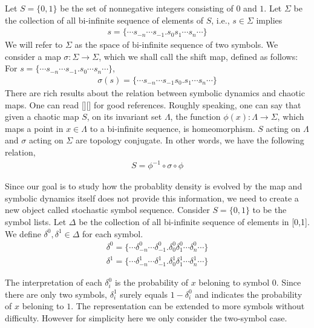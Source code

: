 \documentclass{article}
\begin{document}
Let $S=\{0, 1\}$ be the set of nonnegative integers consisting of $0$ and $1$. Let $\Sigma$ be the collection of all bi-infinite sequence of elements of $S$, i.e., $s\in \Sigma$ implies
 \begin{eqnarray}
 s= \{\cdots s_{-n}\cdots s_{-1}.s_0s_1\cdots s_n\cdots\}
 \end{eqnarray}
We will refer to $\Sigma$ as the space of bi-infinite sequence of two symbols. We consider a map $\sigma:\Sigma \rightarrow \Sigma$, which we shall call the shift map, defined as follows: For $s= \{\cdots s_{-n}\cdots s_{-1}.s_0\cdots s_n\cdots\}$, 
  \begin{eqnarray}
 \sigma(s)= \{\cdots s_{-n}\cdots s_{-1}s_0.s_1\cdots s_n\cdots\}
 \end{eqnarray}
There are rich results about the relation between symbolic dynamics and chaotic maps. One can read [][] for good references. Roughly speaking, one can say that given a chaotic map $S$, on its invariant set $\Lambda$, the function $\phi(x): \Lambda \rightarrow \Sigma$, which maps a point in $x\in \Lambda$ to a bi-infinite sequence, is homeomorphism. $S$ acting on $\Lambda$ and $\sigma$ acting on $\Sigma$ are topology conjugate. In other words, we have the following relation,
 \begin{eqnarray}
 S = \phi^{-1}\circ \sigma \circ \phi
 \end{eqnarray}


Since our goal is to study how the probablity density is evolved by the map and symbolic dynamics itself does not provide this information, we need to create a new object called stochastic symbol sequence. Consider $S=\{0, 1\}$ to be the symbol lists. Let $\Delta$ be the collection of all bi-infinite sequence of elements in [0,1]. We define $\delta^0 , \delta^1 \in \Delta$ for each symbol.
 \begin{eqnarray}
 \delta^0 = \{\cdots \delta_{-n}^0\cdots \delta_{-1}^0.\delta_0^0 \delta_1^0\cdots \delta_n^0\cdots\}\\
 \delta^1 = \{\cdots \delta_{-n}^1\cdots \delta_{-1}^1.\delta_0^1 \delta_1^1\cdots \delta_n^1\cdots\}
 \end{eqnarray}

The interpretation of each $\delta_i^0$ is the probability of $x$ beloning to symbol $0$. Since there are only two symbols, $\delta_i^1$ surely equals $1-\delta_i^0 $ and indicates the probability of $x$ beloning to $1$. The representation can be extended to more symbols without difficulty. However for simplicity here we only consider the two-symbol case. 
\end{document}
